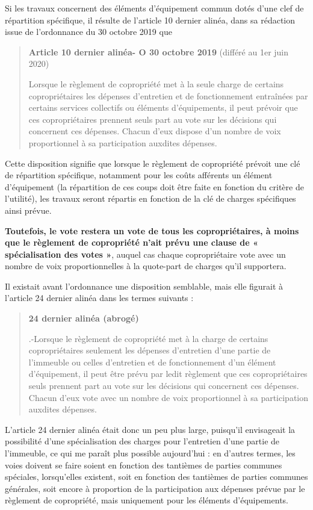 				Si les travaux concernent des éléments d’équipement commun dotés d’une clef de répartition spécifique, il résulte de l’article 10 dernier alinéa, dans sa rédaction issue de l’ordonnance du 30 octobre 2019 que
				\begin{quote}
					{\bfseries Article 10 dernier alinéa- O 30 octobre 2019} (différé au 1er juin 2020)
					
					Lorsque le règlement de copropriété met à la seule charge de certains copropriétaires les dépenses d'entretien et de fonctionnement entraînées par certains services collectifs ou éléments d'équipements, il peut prévoir que ces copropriétaires prennent seuls part au vote sur les décisions qui concernent ces dépenses. Chacun d'eux dispose d'un nombre de voix proportionnel à sa participation auxdites dépenses.
				\end{quote}
				
				Cette disposition signifie que lorsque le règlement de copropriété prévoit une clé de répartition spécifique, notamment pour les coûts afférents un élément d’équipement (la répartition de ces coups doit être faite en fonction du critère de l’utilité), les travaux seront répartis en fonction de la clé de charges spécifiques ainsi prévue.
				
				{\bfseries Toutefois, le vote restera un vote de tous les copropriétaires, à moins que le règlement de copropriété n’ait prévu une clause de « spécialisation des votes »}, auquel cas chaque copropriétaire vote avec un nombre de voix proportionnelles à la quote-part de charges qu’il supportera.
				
				Il existait avant l’ordonnance une disposition semblable, mais elle figurait à l’article 24 dernier alinéa dans les termes suivants :
				\begin{quote}
					{\bfseries 24 dernier alinéa (abrogé)}
					
					\III.-Lorsque le règlement de copropriété met à la charge de certains copropriétaires seulement les dépenses d'entretien d'une partie de l'immeuble ou celles d'entretien et de fonctionnement d'un élément d'équipement, il peut être prévu par ledit règlement que ces copropriétaires seuls prennent part au vote sur les décisions qui concernent ces dépenses. Chacun d'eux vote avec un nombre de voix proportionnel à sa participation auxdites dépenses.
				\end{quote}
				
				L’article 24 dernier alinéa était donc un peu plus large, puisqu’il envisageait la possibilité d’une spécialisation des charges pour l’entretien d’une partie de l’immeuble, ce qui me paraît plus possible aujourd’hui : en d’autres termes, les voies doivent se faire soient en fonction des tantièmes de parties communes spéciales, lorsqu’elles existent, soit en fonction des tantièmes de parties communes générales, soit encore à proportion de la participation aux dépenses prévue par le règlement de copropriété, mais uniquement pour les éléments d’équipements.
			
